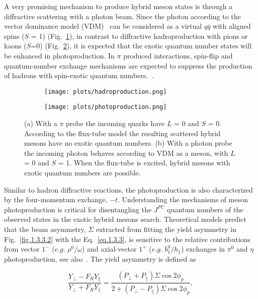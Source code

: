  A very promising mechanism to produce hybrid meson states is through a diffractive scattering with a photon beam. Since the photon according to the vector dominance model (VDM)~\cite{Bauer78} can be considered as a virtual $q\bar{q}$ with aligned spins ($S$ = 1) (Fig.~\ref{fig.1.3.3.1.a}), in contrast to diffractive hadroproduction with pions or kaons ($S$=0) (Fig.~\ref{fig.1.3.3.1.b}), it is expected that the exotic quantum number states will be enhanced in photoproduction. In $\pi$ produced interactions, spin-flip and quantum-number exchange mechanisms are expected to suppress the production of hadrons with spin-exotic quantum numbers.~\cite{Isgur85, Szczepaniak01}.

 \begin{figure}[H]
    \centering
    \begin{subfigure}[b]{0.4\textwidth}
        \texttt{[image: plots/hadroproduction.png]}
        \caption{}
        \label{fig.1.3.3.1.a}
    \end{subfigure}\hfill
    \begin{subfigure}[b]{0.45\textwidth}
        \texttt{[image: plots/photoproduction.png]}
        \caption{}
        \label{fig.1.3.3.1.b}
    \end{subfigure}
    \caption{(a) With a $\pi$ probe the incoming quarks have $L$ = 0 and $S$ = 0. According to the flux-tube model the resulting scattered hybrid mesons have no exotic quantum numbers. (b) With a photon probe the incoming photon behaves according to VDM as a meson, with $L$ = 0 and $S$ = 1. When the flux-tube is excited, hybrid mesons with exotic quantum numbers are possible.}
    \label{fig.1.3.3.1}
\end{figure}

Similar to hadron diffractive reactions, the photoproduction is also characterized by the four-momentum exchange, $-t$. Understanding the mechanisms of meson photoproduction is critical for disentangling the $J^{PC}$ quantum numbers of the observed states in the exotic hybrid mesons search. Theoretical models predict that the beam asymmetry, $\Sigma$ extracted from fitting the yield asymmetry in Fig.~\ref{fig.1.3.3.2} with the Eq.~\ref{eq.1.3.3}, is sensitive to the relative contributions from vector $1^{-}$ ($e.g.$ $\rho^{0}/\omega$) and axial-vector $1^{+}$ ($e.g.$ $b_{1}^{0}/h_{1}$) exchanges in $\pi^{0}$ and $\eta$ photoproduction, see also~\cite{Ghoul17}. The yield asymmetry is defined as

\begin{equation}
        \frac{Y_{\perp}-F_{R}Y_{\parallel}}{Y_{\perp}+F_{R}Y_{\parallel}} = \frac{(P_{\perp}+P_{\parallel})\Sigma \cos 2\phi_{p}}{2+(P_{\perp}-P_{\parallel})\Sigma \cos 2\phi_{p}},
        \label{eq.1.3.3}
\end{equation}

